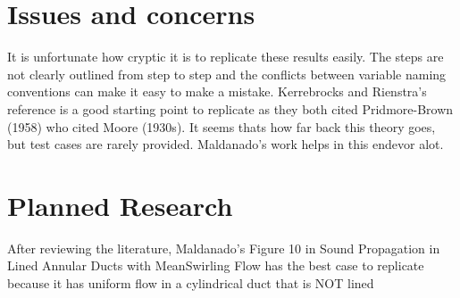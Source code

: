 \documentclass[a4paper]{article}
\begin{document}
\section{Issues and concerns}
It is unfortunate how cryptic it is to replicate these results easily. The steps 
are not clearly outlined from step to step and the conflicts between variable
naming conventions can make it easy to make a mistake. Kerrebrocks and Rienstra's reference is 
a good starting point to replicate as they both cited Pridmore-Brown (1958) who
cited Moore (1930s). It seems thats how far back this theory goes, but test cases
are rarely provided. Maldanado's work helps in this endevor alot.


\section{Planned Research}
After reviewing the literature, Maldanado's Figure 10 in Sound Propagation in Lined Annular Ducts with MeanSwirling Flow
has the best case to replicate because it has uniform flow in a cylindrical
duct that is NOT lined
\end{document}

